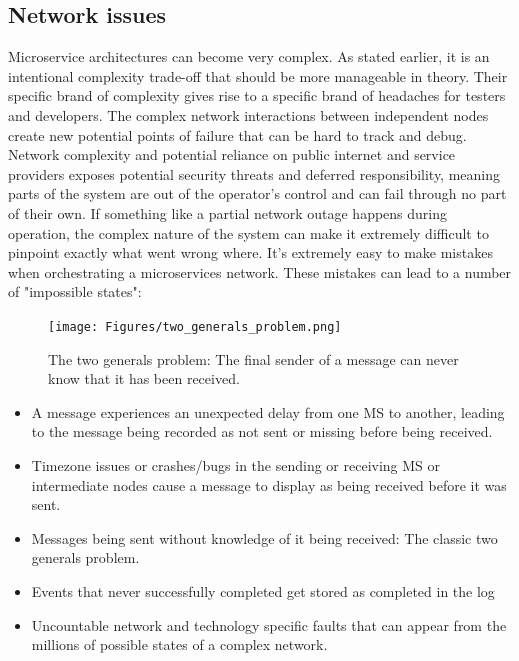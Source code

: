 \subsection{Network issues}
Microservice architectures can become very complex. As stated earlier, it is an intentional complexity trade-off that should be more manageable in theory.
Their specific brand of complexity gives rise to a specific brand of headaches for testers and developers.
The complex network interactions between independent nodes create new potential points of failure that can be hard to track and debug.
Network complexity and potential reliance on public internet and service providers exposes potential security threats and deferred responsibility, meaning parts of the system are out of the operator's control and can fail through no part of their own.
If something like a partial network outage happens during operation, the complex nature of the system can make it extremely difficult to pinpoint exactly what went wrong where.
It's extremely easy to make mistakes when orchestrating a microservices network. These mistakes can lead to a number of "impossible states":
\begin{figure}
    \centering
    \texttt{[image: Figures/two\_generals\_problem.png]}
    \caption{The two generals problem: The final sender of a message can never know that it has been received.}
    \label{Two_generals}
\end{figure}

\begin{itemize}
    \item A message experiences an unexpected delay from one MS to another, leading to the message being recorded as not sent or missing before being received.
    \item Timezone issues or crashes/bugs in the sending or receiving MS or intermediate nodes cause a message to display as being received before it was sent.
    \item Messages being sent without knowledge of it being received: The classic two generals problem.
    \item Events that never successfully completed get stored as completed in the log
    \item Uncountable network and technology specific faults that can appear from the millions of possible states of a complex network.
\end{itemize}

